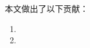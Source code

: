 
\begin{chineseabstract}
\zhlipsum[2,5]

本文做出了以下贡献：

\begin{enumerate}[wide,]
    \item \zhlipsum[1]
    \item \zhlipsum[3]
\end{enumerate}


\end{chineseabstract}

